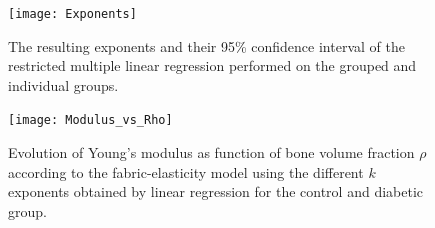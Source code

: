 \documentclass[a4paper,fleqn]{DC_ArtStyle}
\begin{document}
	\begin{figure}
		\centering
		\texttt{[image: Exponents]}
		\caption{The resulting exponents and their 95\% confidence interval of the restricted multiple linear regression performed on the grouped and individual groups.}
		\label{FigExponents}
	\end{figure}

	\begin{figure}
		\centering
		\texttt{[image: Modulus\_vs\_Rho]}
		\caption{Evolution of Young's modulus as function of bone volume fraction $\rho$ according to the fabric-elasticity model using the different $k$ exponents obtained by linear regression for the control and diabetic group.}
		\label{FigEvsRho}
	\end{figure}

	
\end{document}
